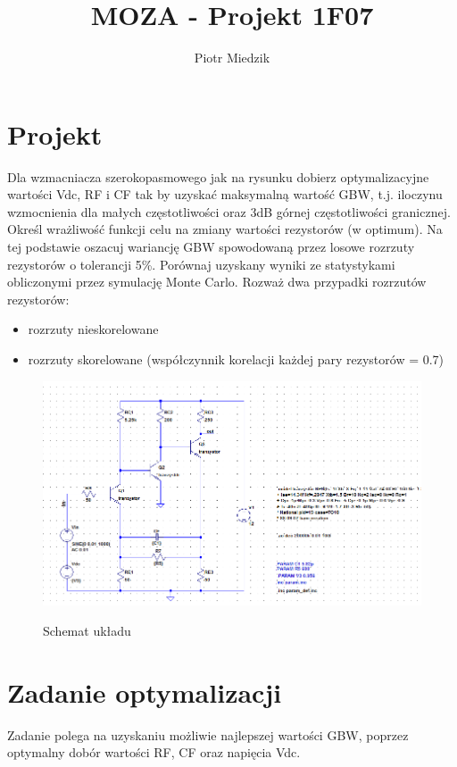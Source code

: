 \documentclass[10pt,a4paper]{article}
\author{Piotr Miedzik}
\title{MOZA - Projekt 1F07}
\begin{document}
\maketitle

\listoftodos
\section{Projekt}


Dla wzmacniacza szerokopasmowego jak na rysunku dobierz optymalizacyjne wartości Vdc, RF i CF tak by uzyskać maksymalną wartość GBW,
t.j. iloczynu wzmocnienia dla małych częstotliwości oraz 3dB górnej częstotliwości granicznej.
Określ wrażliwość funkcji celu na zmiany wartości rezystorów (w optimum).
Na tej podstawie oszacuj wariancję GBW spowodowaną przez losowe rozrzuty rezystorów o tolerancji 5\%.
Porównaj uzyskany wyniki ze statystykami obliczonymi przez symulację Monte Carlo.
Rozważ dwa przypadki rozrzutów rezystorów:
\begin{itemize}
\item rozrzuty nieskorelowane
\item rozrzuty skorelowane (współczynnik korelacji każdej pary rezystorów = 0.7)
\end{itemize}

\begin{figure}[H]
  \caption{Schemat układu}
  \centering
\includegraphics[scale=0.5]{obrazki/schemat2.png}
  \label{fig:schemat_ukladu}
\end{figure}


\section{Zadanie optymalizacji}
Zadanie polega na uzyskaniu możliwie najlepszej wartości GBW, poprzez optymalny dobór wartości RF, CF oraz napięcia Vdc.
\end{document}
